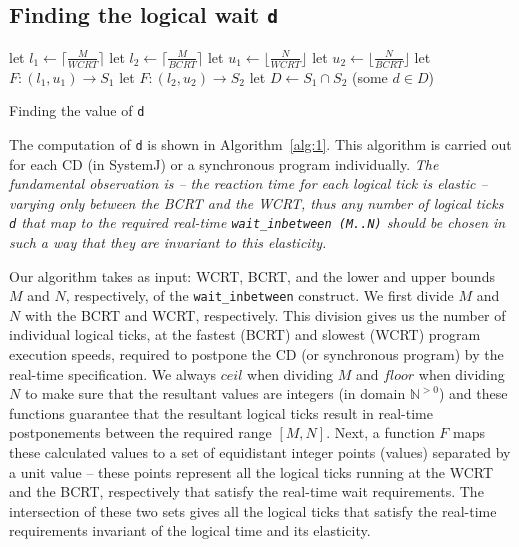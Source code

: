 \subsection{Finding the logical wait \texttt{d}}
\label{sec:find-logic-delay}

\begin{algorithm}[t!]
  \begin{minipage}{1.0\linewidth}
    \SetAlgoLined
    let $l_1 \leftarrow \lceil \frac{M}{WCRT} \rceil$\;
    let $l_2 \leftarrow \lceil \frac{M}{BCRT} \rceil$\;
    let $u_1 \leftarrow \lfloor \frac{N}{WCRT} \rfloor$\;
    let $u_2 \leftarrow \lfloor \frac{N}{BCRT} \rfloor$\;
    let $F:(l_1,u_1) \rightarrow S_1$\;
    let $F:(l_2,u_2) \rightarrow S_2$\;
    let $D \leftarrow S_1 \cap S_2$\;
    \Return (some $d \in D$)\;
    \caption{Finding the value of \texttt{d}}
    \label{alg:1}
  \end{minipage}
\end{algorithm}

The computation of \texttt{d} is shown in Algorithm~\ref{alg:1}. This
algorithm is carried out for each CD (in SystemJ) or a synchronous
program individually. \textit{The fundamental observation is -- the
  reaction time for each logical tick is elastic -- varying only between
  the BCRT and the WCRT, thus any number of logical ticks \texttt{d}
  that map to the required real-time \mbox{\texttt{wait\_inbetween
      (M..N)}} should be chosen in such a way that they are invariant to
  this elasticity.}

Our algorithm takes as input: WCRT, BCRT, and the lower and upper bounds
$M$ and $N$, respectively, of the \texttt{wait\_inbetween} construct. We
first divide $M$ and $N$ with the BCRT and WCRT, respectively. This
division gives us the number of individual logical ticks, at the fastest
(BCRT) and slowest (WCRT) program execution speeds, required to postpone
the CD (or synchronous program) by the real-time specification. We
always $ceil$ when dividing $M$ and $floor$ when dividing $N$ to make
sure that the resultant values are integers (in domain
$\mathbb{N}^{>0}$) and these functions guarantee that the resultant
logical ticks result in real-time postponements between the required
range $[M,N]$. Next, a function $F$ maps these calculated values to a
set of equidistant integer points (values) separated by a unit value --
these points represent all the logical ticks running at the WCRT and the
BCRT, respectively that satisfy the real-time wait requirements. The
intersection of these two sets gives all the logical ticks that satisfy
the real-time requirements invariant of the logical time and its
elasticity.

